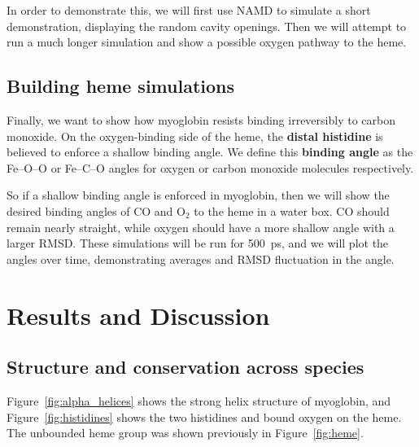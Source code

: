 \documentclass{article}
\begin{document}
In order to demonstrate this, we will first use NAMD to simulate a short demonstration, displaying the random cavity openings.  Then we will attempt to run a much longer simulation and show a possible oxygen pathway to the heme.

\subsection{Building heme simulations}

Finally, we want to show how myoglobin resists binding irreversibly to carbon monoxide.  On the oxygen-binding side of the heme, the \textbf{distal histidine} is believed to enforce a shallow binding angle.  We define this \textbf{binding angle} as the Fe--O--O or Fe--C--O angles for oxygen or carbon monoxide molecules respectively.



So if a shallow binding angle is enforced in myoglobin, then we will show the desired binding angles of CO and O$_2$ to the heme in a water box.  CO should remain nearly straight, while oxygen should have a more shallow angle with a larger RMSD.  These simulations will be run for \SI{500}{\pico\second}, and we will plot the angles over time, demonstrating averages and RMSD fluctuation in the angle.

\section{Results and Discussion}

\subsection{Structure and conservation across species}

Figure~\ref{fig:alpha_helices} shows the strong helix structure of myoglobin, and Figure~\ref{fig:histidines} shows the two histidines and bound oxygen on the heme.  The unbounded heme group was shown previously in Figure~\ref{fig:heme}.
\end{document}
